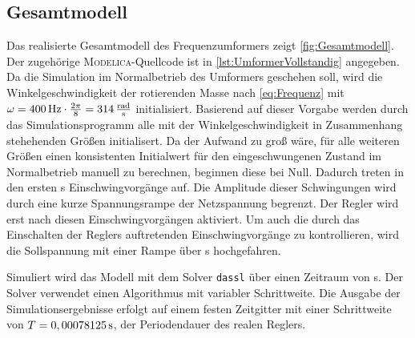 \subsection{Gesamtmodell}\label{gesamtmodell}
Das realisierte Gesamtmodell des Frequenzumformers zeigt \cref{fig:Gesamtmodell}. Der zugehörige \textsc{Modelica}-Quellcode ist in \cref{lst:UmformerVollstandig} angegeben. Da die Simulation im Normalbetrieb des Umformers geschehen soll, wird die Winkelgeschwindigkeit der rotierenden Masse nach \cref{eq:Frequenz} mit $\omega = \unit[400]{Hz}\cdot \frac{2\pi}{8} = \unit[314]{\frac{rad}{s}}$ initialisiert. Basierend auf dieser Vorgabe werden durch das Simulationsprogramm alle mit der Winkelgeschwindigkeit in Zusammenhang stehehenden Größen initialisert. Da der Aufwand zu groß wäre, für alle weiteren Größen einen konsistenten Initialwert für den eingeschwungenen Zustand im Normalbetrieb manuell zu berechnen, beginnen diese bei Null. Dadurch treten in den ersten \unit[0,7]{s} Einschwingvorgänge auf. Die Amplitude dieser Schwingungen wird durch eine kurze Spannungsrampe der Netzspannung begrenzt. Der Regler wird erst nach diesen Einschwingvorgängen aktiviert. Um auch die durch das Einschalten der Reglers auftretenden Einschwingvorgänge zu kontrollieren, wird die Sollspannung mit einer Rampe über \unit[0,3]{s} hochgefahren.

Simuliert wird das Modell mit dem Solver \texttt{dassl} über einen Zeitraum von \unit[3]{s}. Der Solver verwendet einen Algorithmus mit variabler Schrittweite. Die Ausgabe der Simulationsergebnisse erfolgt auf einem festen Zeitgitter mit einer Schrittweite von $T=\unit[0,00078125]{s}$, der Periodendauer des realen Reglers. 
